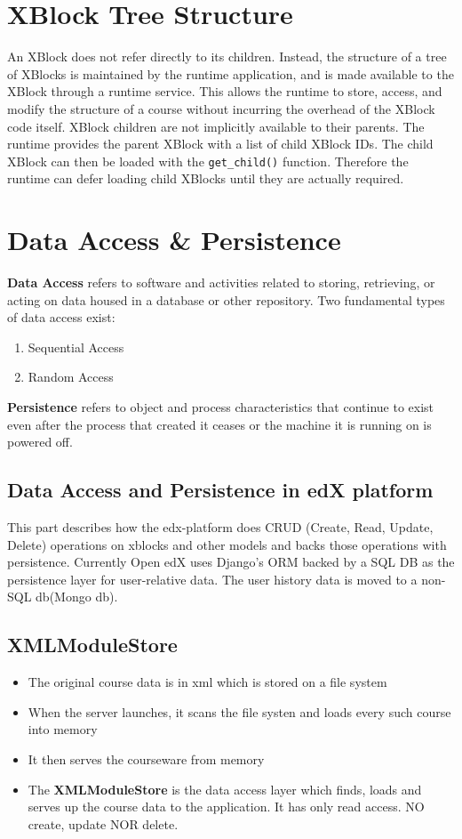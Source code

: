 \section{XBlock Tree Structure}
An XBlock does not refer directly to its children. Instead, the structure of a tree of XBlocks is
maintained by the runtime application, and is made available to the XBlock through a runtime
service.\newline
This allows the runtime to store, access, and modify the structure of a course without incurring the
overhead of the XBlock code itself.\newline
XBlock children are not implicitly available to their parents. The runtime provides the parent
XBlock with a list of child XBlock IDs. The child XBlock can then be loaded with the
\verb|get_child()| function. Therefore the runtime can defer loading child XBlocks until they are actually
required.

\section{Data Access \& Persistence}
\textbf{Data Access} refers to software and activities related to storing, retrieving, or acting on data housed
in a database or other repository. Two fundamental types of data access exist:
\begin{enumerate}
	\item Sequential Access
	\item Random Access
\end{enumerate}
\textbf{Persistence} refers to object and process characteristics that continue to exist even after the
process that created it ceases or the machine it is running on is powered off.

\subsection{Data Access and Persistence in edX platform}
This part describes how the edx-platform does CRUD (Create, Read, Update, Delete) operations on
xblocks and other models and backs those operations with persistence. Currently Open edX uses
Django's ORM backed by a SQL DB as the persistence layer for user-relative data. The user history
data is moved to a non-SQL db(Mongo db).

\subsection{XMLModuleStore}
\begin{itemize}
	\item The original course data is in xml which is stored on a file system
	\item When the server launches, it scans the file systen and loads every such course into memory
	\item It then serves the courseware from memory
	\item The \textbf{XMLModuleStore} is the data access layer which finds, loads and serves up the course data to the application. It has only read access. NO create, update NOR delete.
\end{itemize}

